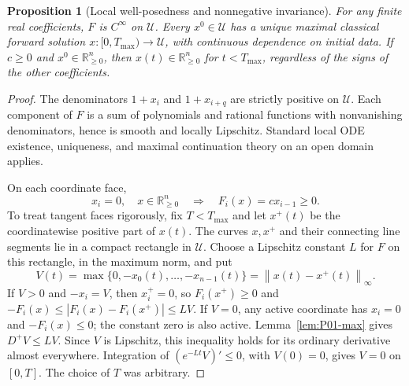 \documentclass[11pt]{article}
\newcommand{\R}{\mathbb{R}}
\newcommand{\Orth}{\R_{\geq 0}^{n}}
\newcommand{\Domain}{\mathcal{U}}
\newcommand{\norm}[1]{\left\lVert #1\right\rVert}
\newtheorem{proposition}[theorem]{Proposition}
\theoremstyle{definition}
\theoremstyle{remark}
\begin{document}
\begin{proposition}[Local well-posedness and nonnegative invariance]
\label{prop:P01-local}
For any finite real coefficients, $F$ is $C^\infty$ on $\Domain$.
Every $x^0\in\Domain$ has a unique maximal classical forward solution
$x:[0,T_{\max})\to\Domain$, with continuous dependence on initial data.
If $c\ge0$ and $x^0\in\Orth$, then $x(t)\in\Orth$ for $t<T_{\max}$,
regardless of the signs of the other coefficients.
\end{proposition}
\begin{proof}
The denominators $1+x_i$ and $1+x_{i+q}$ are strictly positive on
$\Domain$. Each component of $F$ is a sum of polynomials and rational
functions with nonvanishing denominators, hence is smooth and locally
Lipschitz. Standard local ODE existence, uniqueness, and maximal
continuation theory on an open domain applies.

On each coordinate face,
\begin{equation}
\label{eq:P01-face}
 x_i=0,\quad x\in\Orth\quad\Longrightarrow\quad F_i(x)=c x_{i-1}\ge0.
\end{equation}
To treat tangent faces rigorously, fix $T<T_{\max}$ and let $x^+(t)$
be the coordinatewise positive part of $x(t)$. The curves $x,x^+$ and
their connecting line segments lie in a compact rectangle in $\Domain$.
Choose a Lipschitz constant $L$ for $F$ on this rectangle, in the
maximum norm, and put
\[
 V(t)=\max\{0,-x_0(t),\ldots,-x_{n-1}(t)\}
      =\norm{x(t)-x^+(t)}_\infty.
\]
If $V>0$ and $-x_i=V$, then $x_i^+=0$, so
$F_i(x^+)\ge0$ and $-F_i(x)\le |F_i(x)-F_i(x^+)|\le LV$.
If $V=0$, any active coordinate has $x_i=0$ and $-F_i(x)\le0$;
the constant zero is also active. Lemma~\ref{lem:P01-max} gives
$D^+V\le LV$. Since $V$ is Lipschitz, this inequality holds for its
ordinary derivative almost everywhere. Integration of
$(e^{-Lt}V)' \le0$, with $V(0)=0$, gives $V=0$ on $[0,T]$.
The choice of $T$ was arbitrary.
\end{proof}
\end{document}
